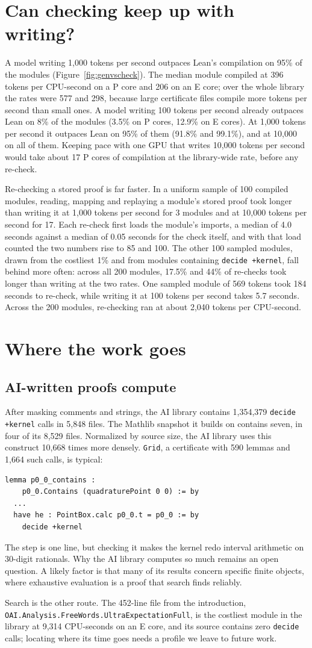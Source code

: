 \documentclass[10pt,twocolumn]{article}
\newcommand{\dk}{\texttt{decide +kernel}}
\newcommand{\SampleRecheckSummary}{Re-checking a stored proof is far
faster. In a uniform sample of 100 compiled modules, reading, mapping and
replaying a module's stored proof took longer than writing it at 1,000
tokens per second for 3 modules and at 10,000 tokens per second for 17.
Each re-check first loads the module's imports, a median of 4.0 seconds
against a median of 0.05 seconds for the check itself, and with that load
counted the two numbers rise to 85 and 100. The other 100 sampled modules,
drawn from the costliest 1\% and from modules containing \dk{}, fall
behind more often: across all 200 modules, 17.5\% and 44\% of re-checks
took longer than writing at the two rates. One sampled module of 569 tokens
took 184 seconds to re-check, while writing it at 100 tokens per second
takes 5.7 seconds. Across the 200 modules, re-checking ran at about 2,040
tokens per CPU-second.}
\begin{document}
\section{Can checking keep up with writing?}\label{sec:race}
A model writing 1,000 tokens per second outpaces Lean's compilation on 95\%
of the modules (Figure~\ref{fig:genvscheck}). The median module compiled at 396 tokens per CPU-second on a P core and 206 on
an E core; over the whole library the rates were 577 and 298, because large
certificate files compile more tokens per second than small ones. A model
writing 100 tokens per second already outpaces Lean on 8\% of the modules
(3.5\% on P cores, 12.9\% on E cores). At 1,000 tokens per second it
outpaces Lean on 95\% of them (91.8\% and 99.1\%), and at 10,000 on all of
them. Keeping pace with one GPU that writes 10,000 tokens per second would
take about 17 P cores of compilation at the library-wide rate, before any
re-check.

\SampleRecheckSummary{}

\section{Where the work goes}\label{sec:work}
\subsection{AI-written proofs compute}
After masking comments and strings, the AI library contains 1,354,379
\dk{} calls in 5,848 files. The Mathlib snapshot it builds on contains
seven, in four of its 8,529 files. Normalized by source size, the AI
library uses this construct 10,668 times more densely. \texttt{Grid}, a
certificate with 590 lemmas and 1,664 such calls, is typical:
\begin{footnotesize}
\begin{verbatim}
lemma p0_0_contains :
    p0_0.Contains (quadraturePoint 0 0) := by
  ...
  have he : PointBox.calc p0_0.t = p0_0 := by
    decide +kernel
\end{verbatim}
\end{footnotesize}
\noindent The step is one line, but checking it makes the kernel redo
interval arithmetic on 30-digit rationals. Why the AI library computes so
much remains an open question. A likely factor is that many of its results
concern specific finite objects, where exhaustive evaluation is a proof
that search finds reliably.

Search is the other route. The 452-line file from the introduction,
\texttt{OAI.Analysis.FreeWords.}\allowbreak\texttt{UltraExpectationFull},
is the costliest module in the library at 9,314 CPU-seconds on an E core,
and its source contains zero \texttt{decide} calls; locating where its
time goes needs a profile we leave to future work.
\end{document}
